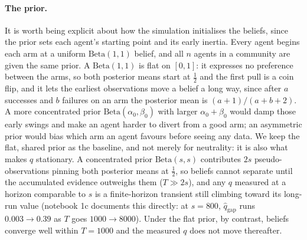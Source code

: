 \documentclass[12pt]{article}
\begin{document}
\paragraph{The prior.}
It is worth being explicit about how the simulation initialises the beliefs, since the prior sets each agent's starting point and its early inertia. Every agent begins each arm at a uniform $\mathrm{Beta}(1,1)$ belief, and all $n$ agents in a community are given the same prior. A $\mathrm{Beta}(1,1)$ is flat on $[0,1]$: it expresses no preference between the arms, so both posterior means start at $\tfrac12$ and the first pull is a coin flip, and it lets the earliest observations move a belief a long way, since after $a$ successes and $b$ failures on an arm the posterior mean is $(a+1)/(a+b+2)$. A more concentrated prior $\mathrm{Beta}(\alpha_0,\beta_0)$ with larger $\alpha_0+\beta_0$ would damp those early swings and make an agent harder to divert from a good arm; an asymmetric prior would bias which arm an agent favours before seeing any data. We keep the flat, shared prior as the baseline, and not merely for neutrality: it is also what makes $q$ stationary. A concentrated prior $\mathrm{Beta}(s,s)$ contributes $2s$ pseudo-observations pinning both posterior means at $\tfrac12$, so beliefs cannot separate until the accumulated evidence outweighs them ($T \gg 2s$), and any $q$ measured at a horizon comparable to $s$ is a finite-horizon transient still climbing toward its long-run value (notebook 1c documents this directly: at $s = 800$, $\hat q_{\text{gap}}$ runs $0.003 \to 0.39$ as $T$ goes $1000 \to 8000$). Under the flat prior, by contrast, beliefs converge well within $T = 1000$ and the measured $q$ does not move thereafter.
\end{document}
